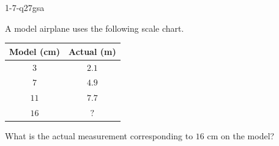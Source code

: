 \begin{practiceQuestion}{1-7-q27}{gsa}
\begin{questionText}
A model airplane uses the following scale chart.

\begin{center}
\begin{tabular}{|c|c|}
\hline
\textbf{Model (cm)} & \textbf{Actual (m)} \\
\hline
$3$ & $2.1$ \\
$7$ & $4.9$ \\
$11$ & $7.7$ \\
$16$ & $?$ \\
\hline
\end{tabular}
\end{center}

What is the actual measurement corresponding to $16$ cm on the model?
\end{questionText}
\end{practiceQuestion}

